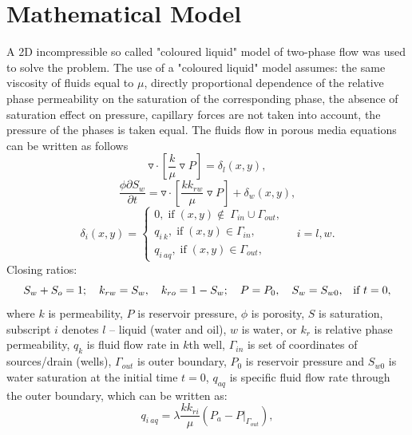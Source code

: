\documentclass[
11pt,%
tightenlines,%
twoside,%
onecolumn,%
nofloats,%
nobibnotes,%
nofootinbib,%
superscriptaddress,%
noshowpacs,%
centertags]%
{revtex4}
\begin{document}
\section{Mathematical Model}
A 2D incompressible so called "coloured liquid" model of two-phase flow \cite{bas} was used to solve the problem. The use of a "coloured liquid" model assumes: the same viscosity of fluids equal to $\mu$, directly proportional dependence of the relative phase permeability on the saturation of the corresponding phase, the absence of saturation effect on pressure, capillary forces are not taken into account, the pressure of the phases is taken equal. The fluids flow in porous media
equations can be written as follows
\begin{equation} \label{fil}
\triangledown \cdot \left[\frac{k}{\mu}\triangledown P \right] = \delta_{l}(x,y),
\end{equation}
\begin{equation} \label{fil2}
\frac{\phi\partial S_w}{\partial t} = \triangledown\cdot \left[\frac{kk_{rw}}{\mu}\triangledown P \right] +\delta_w(x,y),
\end{equation}
\begin{equation} \label{bc}
\delta_{i}(x,y)  = \left\{\begin{array}{crl}
0, \;\mbox{if}\;(x,y) \notin\ \Gamma_{in}\cup\Gamma_{out},\\
q_{i\:k}, \;\mbox{if}\;(x,y) \in \Gamma_{in},\\
q_{i\:aq}, \;\mbox{if}\;(x,y) \in \Gamma_{out},
\end{array}\right. \quad i = l,w.
\end{equation}
Closing ratios:
\begin{equation} \label{kr}
 S_w + S_o = 1;\quad
    k_{rw} = S_w, \quad k_{ro} = 1 - S_w; \quad P = P_0,\quad S_w = S_{w0}\mbox{,\quad \mbox{if} $t=0$},
\end{equation}
where $k$ is permeability, $P$ is reservoir pressure, $\phi$ is
porosity, $S$ is saturation, subscript $i$ denotes $l$ -- liquid
(water and oil), $w$ is water, or $k_{r}$ is relative phase
permeability, $q_k$ is fluid flow rate in $k$th well, $\Gamma_{in}$
is set of coordinates of sources/drain (wells), $\Gamma_{out}$ is
outer boundary, $P_0$ is reservoir pressure and $S_{w0}$ is water
saturation at the initial time $t=0$, $q_{aq}$ is specific fluid flow rate through the outer boundary, which can be written as:
\begin{equation*} \label{qaq}
q_{i\:aq} = \lambda \frac{kk_{ri}}{\mu}(P_{a} - P|_{\Gamma_{out}}),
\end{equation*}
\end{document}
